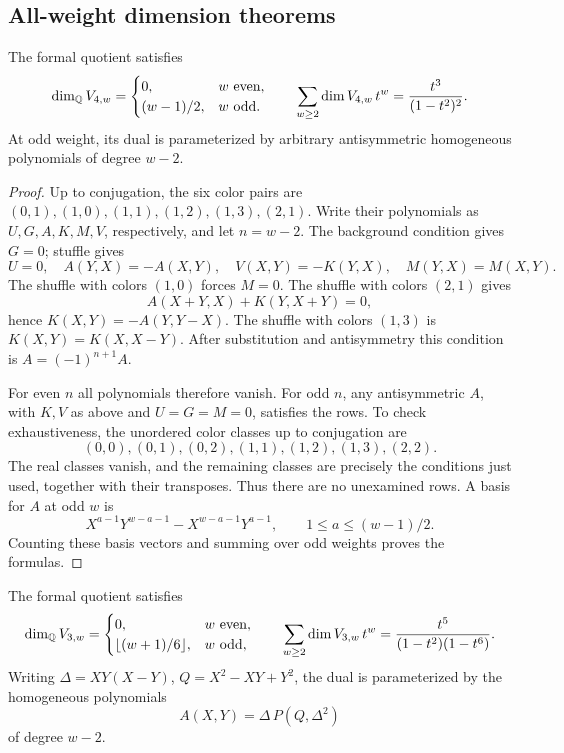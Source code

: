 \subsection{All-weight dimension theorems}

\begin{theorem}\label{cycloquot:thm:level-four}
The formal quotient satisfies
\[
 \dim_{\mathbb{Q}} V_{4,w}=
 \begin{cases}
 0,&w\ \text{even},\\
 (w-1)/2,&w\ \text{odd}.
 \end{cases}
 \qquad
 \sum_{w\geq2}\dim V_{4,w}\,t^w=\frac{t^3}{(1-t^2)^2}.
\]
At odd weight, its dual is parameterized by arbitrary antisymmetric
homogeneous polynomials of degree \(w-2\).
\end{theorem}

\begin{proof}
Up to conjugation, the six color pairs are
\((0,1),(1,0),(1,1),(1,2),(1,3),(2,1)\).
Write their polynomials as \(U,G,A,K,M,V\), respectively, and let
\(n=w-2\). The background condition gives \(G=0\);
stuffle gives
\[
 U=0,\quad A(Y,X)=-A(X,Y),\quad
 V(X,Y)=-K(Y,X),\quad M(Y,X)=M(X,Y).
\]
The shuffle with colors \((1,0)\) forces \(M=0\).
The shuffle with colors \((2,1)\) gives
\[
 A(X+Y,X)+K(Y,X+Y)=0,
\]
hence \(K(X,Y)=-A(Y,Y-X)\).
The shuffle with colors \((1,3)\) is
\(K(X,Y)=K(X,X-Y)\).
After substitution and antisymmetry this condition is
\(A=(-1)^{n+1}A\).

For even \(n\) all polynomials therefore vanish.
For odd \(n\), any antisymmetric \(A\), with \(K,V\) as above and
\(U=G=M=0\), satisfies the rows. To check exhaustiveness, the
unordered color classes up to conjugation are
\[
 (0,0),(0,1),(0,2),(1,1),(1,2),(1,3),(2,2).
\]
The real classes vanish, and the remaining classes are precisely the
conditions just used, together with their transposes. Thus there are
no unexamined rows.
A basis for \(A\) at odd \(w\) is
\[
 X^{a-1}Y^{w-a-1}-X^{w-a-1}Y^{a-1},
 \qquad 1\leq a\leq(w-1)/2.
\]
Counting these basis vectors and summing over odd weights proves
the formulas.
\end{proof}

\begin{theorem}\label{cycloquot:thm:level-three}
The formal quotient satisfies
\[
 \dim_{\mathbb{Q}} V_{3,w}=
 \begin{cases}
 0,&w\ \text{even},\\
 \lfloor(w+1)/6\rfloor,&w\ \text{odd},
 \end{cases}
 \qquad
 \sum_{w\geq2}\dim V_{3,w}\,t^w
       =\frac{t^5}{(1-t^2)(1-t^6)}.
\]
Writing \(\Delta=XY(X-Y)\), \(Q=X^2-XY+Y^2\), the dual is parameterized
by the homogeneous polynomials
\[
 A(X,Y)=\Delta\,P(Q,\Delta^2)
\]
of degree \(w-2\).
\end{theorem}

